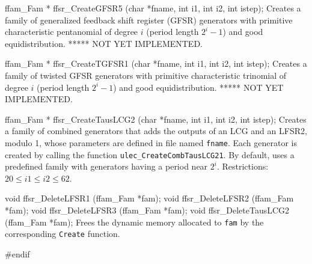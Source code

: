 ffam_Fam * ffsr_CreateGFSR5 (char *fname, int i1, int i2, int istep);
\endcode
\tab
 Creates a family of generalized feedback shift register (GFSR) generators
 with primitive characteristic pentanomial of degree $i$
 (period length $2^i-1$) and good equidistribution.
 ***** NOT YET IMPLEMENTED.
\endtab
\code


ffam_Fam * ffsr_CreateTGFSR1 (char *fname, int i1, int i2, int istep);
\endcode
\tab
 Creates a family of twisted GFSR generators with primitive characteristic
 trinomial of degree $i$
 (period length $2^i-1$) and good equidistribution.
 ***** NOT YET IMPLEMENTED.
\endtab
\code


ffam_Fam * ffsr_CreateTausLCG2 (char *fname, int i1, int i2, int istep);
\endcode
\tab
 Creates a family of combined generators that adds the outputs of an LCG
 and an LFSR2, modulo 1, whose parameters are defined in file named
 {\tt fname}. Each generator is created by calling the function
  {\tt ulec\_CreateCombTausLCG21}. By default, uses a 
 predefined family with generators having a period near $2^i$.
 Restrictions: $20 \le i1 \le i2 \le 62$.
\endtab




\code

void ffsr_DeleteLFSR1 (ffam_Fam *fam);
void ffsr_DeleteLFSR2 (ffam_Fam *fam);
void ffsr_DeleteLFSR3 (ffam_Fam *fam);
void ffsr_DeleteTausLCG2 (ffam_Fam *fam);
\endcode
\tab
 Frees the dynamic memory allocated to {\tt fam} by the corresponding
 {\tt Create} function.
\endtab
\code

\hide
#endif
\endhide
\endcode
